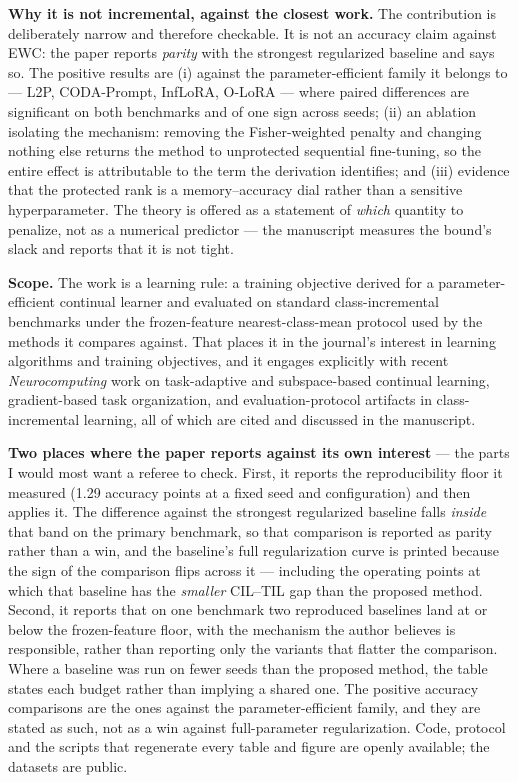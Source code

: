 \documentclass[10pt]{article}
\begin{document}
\textbf{Why it is not incremental, against the closest work.} The contribution is
deliberately narrow and therefore checkable. It is not an accuracy claim against EWC: the
paper reports \emph{parity} with the strongest regularized baseline and says so. The
positive results are (i) against the parameter-efficient family it belongs to --- L2P,
CODA-Prompt, InfLoRA, O-LoRA --- where paired differences are significant on both
benchmarks and of one sign across seeds; (ii) an ablation isolating the mechanism:
removing the Fisher-weighted penalty and changing nothing else returns the method to
unprotected sequential fine-tuning, so the entire effect is attributable to the term the
derivation identifies; and (iii) evidence that the protected rank is a memory--accuracy
dial rather than a sensitive hyperparameter. The theory is offered as a statement of
\emph{which} quantity to penalize, not as a numerical predictor --- the manuscript
measures the bound's slack and reports that it is not tight.

\textbf{Scope.} The work is a learning rule: a training objective derived for a
parameter-efficient continual learner and evaluated on standard class-incremental
benchmarks under the frozen-feature nearest-class-mean protocol used by the methods it
compares against. That places it in the journal's interest in learning algorithms and
training objectives, and it engages explicitly with recent \emph{Neurocomputing} work on
task-adaptive and subspace-based continual learning, gradient-based task organization, and
evaluation-protocol artifacts in class-incremental learning, all of which are cited and
discussed in the manuscript.

\textbf{Two places where the paper reports against its own interest} --- the parts I would
most want a referee to check. First, it reports the reproducibility floor it measured
(1.29 accuracy points at a fixed seed and configuration) and then applies it. The
difference against the strongest regularized baseline falls \emph{inside} that band on the
primary benchmark, so that comparison is reported as parity rather than a win, and the
baseline's full regularization curve is printed because the sign of the comparison flips
across it --- including the operating points at which that baseline has the \emph{smaller}
CIL--TIL gap than the proposed method. Second, it reports that on one benchmark two reproduced
baselines land at or below the frozen-feature floor, with the mechanism the author
believes is responsible, rather than reporting only the variants that flatter the
comparison. Where a baseline was run on fewer seeds than the proposed method, the table
states each budget rather than implying a shared one. The positive accuracy comparisons
are the ones against the parameter-efficient family, and they are stated as such, not as
a win against full-parameter regularization. Code, protocol and the scripts that
regenerate every table and figure are openly available; the datasets are public.
\end{document}
